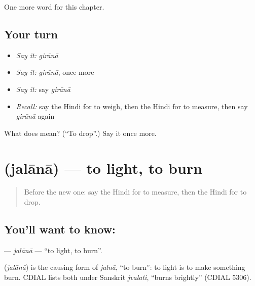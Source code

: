 \begin{grammarlens}[title={What you've built}]
One more word for this chapter.
\end{grammarlens}

\subsection*{Your turn}
\begin{itemize}
\raggedright
  \item \emph{Say it:} \emph{girānā}
  \item \emph{Say it:} \emph{girānā}, once more
  \item \emph{Say it:} say \emph{girānā}
  \item \emph{Recall:} say the Hindi for to weigh, then the Hindi for to measure, then say \emph{girānā} again
\end{itemize}

\begin{tcolorbox}[breakable,colback=teal!4,colframe=teal!35!black,title={Before you move on}]
What does  mean? (\textquotedblleft{}To drop\textquotedblright{}.) Say it once more.
\end{tcolorbox}
\section[\texorpdfstring{\hi{जलाना} (jalānā)}{जलाना (jalānā)}]{ (jalānā) — to light, to burn}

\label{lesson:HI-C175-jalana}



\begin{quote}
Before the new one: say the Hindi for to measure, then the Hindi for to drop.
\end{quote}

\subsection*{You'll want to know: }
\textbf{} — \emph{jalānā} — \textquotedblleft{}to light, to burn\textquotedblright{}.

\begin{cousinweb}
\textbf{} (\emph{jalānā}) is the causing form of \emph{jalnā}, \textquotedblleft{}to burn\textquotedblright{}: to light is to make something burn. CDIAL lists both under Sanskrit \emph{jvalati}, \textquotedblleft{}burns brightly\textquotedblright{} (CDIAL 5306).
\end{cousinweb}

